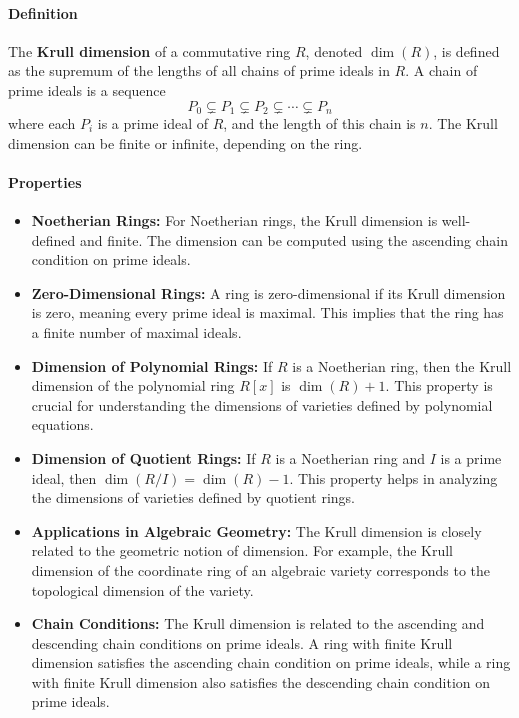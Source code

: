 \documentclass[12pt]{article}
\theoremstyle{definition}
\numberwithin{equation}{subsection}
\begin{document}
\paragraph{Definition}
The \textbf{Krull dimension} of a commutative ring $R$, denoted $\dim(R)$, is defined as the supremum of the lengths of all chains of prime ideals in $R$. A chain of prime ideals is a sequence
\[
P_0 \subsetneq P_1 \subsetneq P_2 \subsetneq \cdots \subsetneq P_n
\]
where each $P_i$ is a prime ideal of $R$, and the length of this chain is $n$. The Krull dimension can be finite or infinite, depending on the ring.
\paragraph{Properties}
\begin{itemize}
\item \textbf{Noetherian Rings:} For Noetherian rings, the Krull dimension is well-defined and finite. The dimension can be computed using the ascending chain condition on prime ideals.
\item \textbf{Zero-Dimensional Rings:} A ring is zero-dimensional if its Krull dimension is zero, meaning every prime ideal is maximal. This implies that the ring has a finite number of maximal ideals.
\item \textbf{Dimension of Polynomial Rings:} If $R$ is a Noetherian ring, then the Krull dimension of the polynomial ring $R[x]$ is $\dim(R) + 1$. This property is crucial for understanding the dimensions of varieties defined by polynomial equations.
\item \textbf{Dimension of Quotient Rings:} If $R$ is a Noetherian ring and $I$ is a prime ideal, then $\dim(R/I) = \dim(R) - 1$. This property helps in analyzing the dimensions of varieties defined by quotient rings.
\item \textbf{Applications in Algebraic Geometry:} The Krull dimension is closely related to the geometric notion of dimension. For example, the Krull dimension of the coordinate ring of an algebraic variety corresponds to the topological dimension of the variety.
\item \textbf{Chain Conditions:} The Krull dimension is related to the ascending and descending chain conditions on prime ideals. A ring with finite Krull dimension satisfies the ascending chain condition on prime ideals, while a ring with finite Krull dimension also satisfies the descending chain condition on prime ideals.
\end{itemize}
\end{document}
